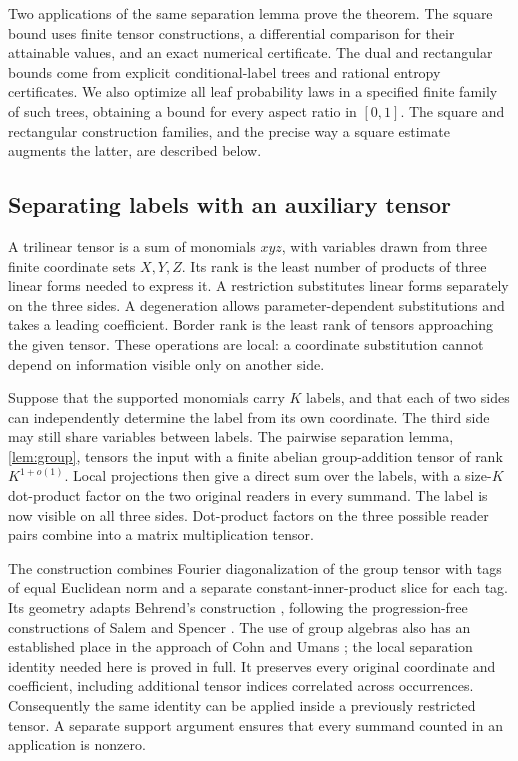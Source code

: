 Two applications of the same separation lemma prove the theorem.
The square bound uses finite tensor constructions, a differential
comparison for their attainable values, and an exact numerical
certificate.  The dual and rectangular bounds come from explicit
conditional-label trees and rational entropy certificates.
We also optimize all leaf probability laws in a specified finite
family of such trees, obtaining a bound for every aspect ratio in
\([0,1]\).  The square and rectangular construction families, and
the precise way a square estimate augments the latter, are described
below.

\subsection{Separating labels with an auxiliary tensor}

A trilinear tensor is a sum of monomials \(xyz\), with variables
drawn from three finite coordinate sets \(X,Y,Z\).  Its rank is the
least number of products of three linear forms needed to express it.
A restriction substitutes linear forms separately on the three
sides.  A degeneration allows parameter-dependent substitutions and
takes a leading coefficient.  Border rank is the least rank of
tensors approaching the given tensor.  These operations are local: a
coordinate substitution cannot depend on information visible only
on another side.

Suppose that the supported monomials carry \(K\) labels, and that
each of two sides can independently determine the label from its own
coordinate.  The third side may still share variables between labels.
The pairwise separation lemma, \cref{lem:group}, tensors the input
with a finite abelian group-addition tensor of rank \(K^{1+o(1)}\).
Local projections then give a direct sum over the labels, with a
size-\(K\) dot-product factor on the two original readers in every
summand.  The label is now visible on all three sides.  Dot-product
factors on the three possible reader pairs combine into a matrix
multiplication tensor.

The construction combines Fourier diagonalization of the group tensor
with tags of equal Euclidean norm and a separate constant-inner-product
slice for each tag.  Its geometry adapts Behrend's construction
\cite{behrend}, following the progression-free constructions of Salem
and Spencer \cite{salem-spencer}.  The use of group algebras also has
an established place in the approach of Cohn and Umans
\cite{cohn-umans}; the local separation identity needed here is proved
in full.  It preserves every original coordinate and coefficient,
including additional tensor indices correlated across occurrences.
Consequently the same identity can be applied inside a previously
restricted tensor.  A separate support argument ensures that every
summand counted in an application is nonzero.

